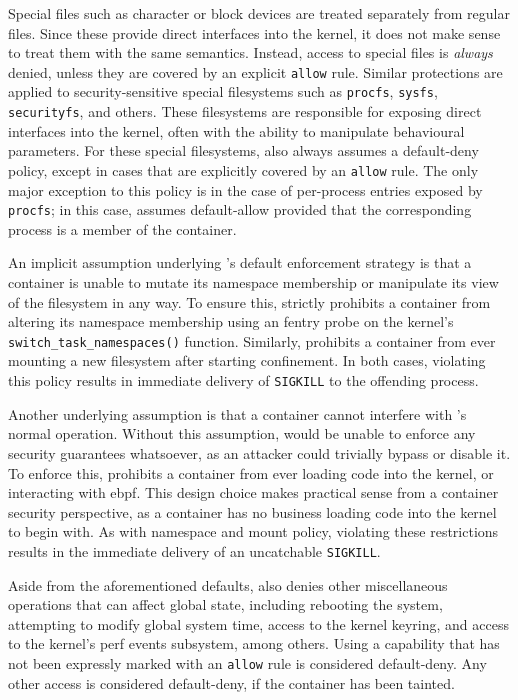 Special files such as character or block devices are treated separately from regular
files. Since these provide direct interfaces into the kernel, it does not make sense to
treat them with the same semantics. Instead, access to special files is \textit{always}
denied, unless they are covered by an explicit \texttt{allow} rule. Similar protections
are applied to security-sensitive special filesystems such as \texttt{procfs},
\texttt{sysfs}, \texttt{securityfs}, and others. These filesystems are responsible for
exposing direct interfaces into the kernel, often with the ability to manipulate
behavioural parameters. For these special filesystems, \bpfcontain{} also always assumes
a default-deny policy, except in cases that are explicitly covered by an \texttt{allow}
rule. The only major exception to this policy is in the case of per-process entries
exposed by \texttt{procfs}; in this case, \bpfcontain{} assumes default-allow provided
that the corresponding process is a member of the container.

An implicit assumption underlying \bpfcontain{}'s default enforcement strategy is that
a container is unable to mutate its namespace membership or manipulate its view of the
filesystem in any way. To ensure this, \bpfcontain{} strictly prohibits a container from
altering its namespace membership using an fentry probe on the kernel's
\texttt{switch\_task\_namespaces()} function. Similarly, \bpfcontain{} prohibits
a container from ever mounting a new filesystem after starting confinement. In both cases,
violating this policy results in immediate delivery of \texttt{SIGKILL} to the offending
process.

Another underlying assumption is that a container cannot interfere with \bpfcontain{}'s
normal operation. Without this assumption, \bpfcontain{} would be unable to enforce any
security guarantees whatsoever, as an attacker could trivially bypass or disable it. To
enforce this, \bpfcontain{} prohibits a container from ever loading code into the kernel,
or interacting with \gls{ebpf}. This design choice makes practical sense from a container
security perspective, as a container has no business loading code into the kernel to begin
with. As with namespace and mount policy, violating these restrictions results in the
immediate delivery of an uncatchable \texttt{SIGKILL}.

Aside from the aforementioned defaults, \bpfcontain{} also denies other miscellaneous
operations that can affect global state, including rebooting the system, attempting to
modify global system time, access to the kernel keyring, and access to the kernel's perf
events subsystem, among others. Using a capability that has not been expressly marked with
an \texttt{allow} rule is considered default-deny. Any other access is considered
default-deny, if the container has been tainted.

